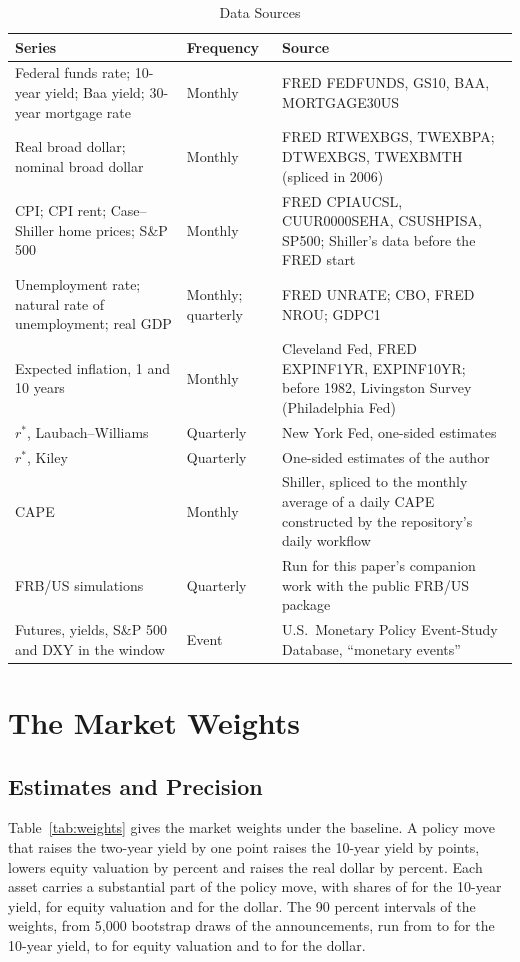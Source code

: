 \documentclass[11pt]{article}
\newcommand{\rs}{r^{*}}
\begin{document}
\begin{appendices}
\begin{table}[tbp]\centering\small
\caption{Data Sources}\label{tab:data}
\begin{tabular}{p{}p{}p{}}\toprule
Series & Frequency & Source \\\midrule
Federal funds rate; 10-year yield; Baa yield; 30-year mortgage rate & Monthly & FRED FEDFUNDS, GS10, BAA, MORTGAGE30US \\
Real broad dollar; nominal broad dollar & Monthly & FRED RTWEXBGS, TWEXBPA; DTWEXBGS, TWEXBMTH (spliced in 2006) \\
CPI; CPI rent; Case--Shiller home prices; S\&P 500 & Monthly & FRED CPIAUCSL, CUUR0000SEHA, CSUSHPISA, SP500; Shiller's data before the FRED start \\
Unemployment rate; natural rate of unemployment; real GDP & Monthly; quarterly & FRED UNRATE; CBO, FRED NROU; GDPC1 \\
Expected inflation, 1 and 10 years & Monthly & Cleveland Fed, FRED EXPINF1YR, EXPINF10YR; before 1982, Livingston Survey (Philadelphia Fed) \\
$\rs$, Laubach--Williams & Quarterly & New York Fed, one-sided estimates \\
$\rs$, Kiley & Quarterly & One-sided estimates of the author \\
CAPE & Monthly & Shiller, spliced to the monthly average of a daily CAPE constructed by the repository's daily workflow \\
FRB/US simulations & Quarterly & Run for this paper's companion work with the public FRB/US package \\
Futures, yields, S\&P 500 and DXY in the window & Event & U.S.\ Monetary Policy Event-Study Database, ``monetary events'' \citep{acosta2025} \\
\bottomrule
\end{tabular}
\end{table}

\section{The Market Weights}\label{app:weights}
\subsection{Estimates and Precision}\label{sec:precision}
Table~\ref{tab:weights} gives the market weights under the baseline. A policy move that raises the two-year yield by one point raises the 10-year yield by  points, lowers equity valuation by  percent and raises the real dollar by  percent. Each asset carries a substantial part of the policy move, with shares of  for the 10-year yield,  for equity valuation and  for the dollar. The 90 percent intervals of the weights, from 5,000 bootstrap draws of the  announcements, run from  to  for the 10-year yield,  to  for equity valuation and  to  for the dollar.


\end{appendices}
\end{document}
